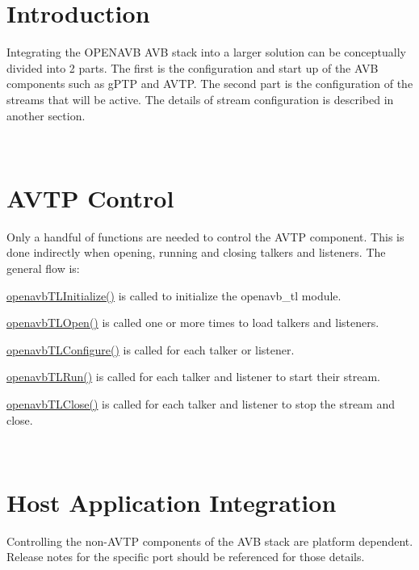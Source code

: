 \hypertarget{sdk_integration_sdk_integration_introduction}{}\section{Introduction }\label{sdk_integration_sdk_integration_introduction}
Integrating the O\+P\+E\+N\+A\+VB A\+VB stack into a larger solution can be conceptually divided into 2 parts. The first is the configuration and start up of the A\+VB components such as g\+P\+TP and A\+V\+TP. The second part is the configuration of the streams that will be active. The details of stream configuration is described in another section.

~\newline
\hypertarget{sdk_integration_sdk_integration_avtp_control}{}\section{A\+V\+T\+P Control }\label{sdk_integration_sdk_integration_avtp_control}
Only a handful of functions are needed to control the A\+V\+TP component. This is done indirectly when opening, running and closing talkers and listeners. The general flow is\+:
\begin{DoxyEnumerate}
\item \hyperlink{build_2sdk__eavb_2openavb__tl__pub_8h_aefac1b8343b87d569a38ecbfc87de883}{openavb\+T\+L\+Initialize()} is called to initialize the openavb\+\_\+tl module.
\item \hyperlink{build_2sdk__eavb_2openavb__tl__pub_8h_a4952af6d10075781ffb320af2ff1665b}{openavb\+T\+L\+Open()} is called one or more times to load talkers and listeners.
\item \hyperlink{build_2sdk__eavb_2openavb__tl__pub_8h_af3f5f9270f359618de3497ab9a469b83}{openavb\+T\+L\+Configure()} is called for each talker or listener.
\item \hyperlink{build_2sdk__eavb_2openavb__tl__pub_8h_a7af14e9b869ab4c29a4d7f51ab78a28a}{openavb\+T\+L\+Run()} is called for each talker and listener to start their stream.
\item \hyperlink{build_2sdk__eavb_2openavb__tl__pub_8h_ae373dc0cd3617f44e3205bbc2f6d84f4}{openavb\+T\+L\+Close()} is called for each talker and listener to stop the stream and close.
\end{DoxyEnumerate}

~\newline
\hypertarget{sdk_integration_sdk_integration_host_app}{}\section{Host Application Integration }\label{sdk_integration_sdk_integration_host_app}
Controlling the non-\/\+A\+V\+TP components of the A\+VB stack are platform dependent. Release notes for the specific port should be referenced for those details. 